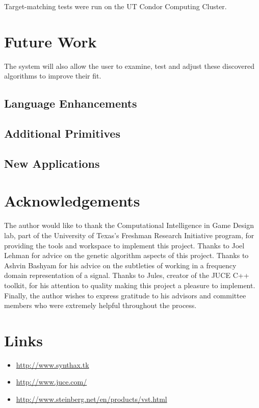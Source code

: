 \documentclass[12pt]{article}
\begin{document}
Target-matching tests were run on the UT Condor Computing Cluster. \begin{comment}Interactive evolution tests were run on a variety of different machines. TODO: fill in with actual data \end{comment}

\section{Future Work}
The system will also allow the user to examine, test and adjust these discovered algorithms to improve their fit.

\subsection{Language Enhancements}\label{FUTUREENHANCEMENTS}
\subsection{Additional Primitives}\label{FUTUREPRIMITIVES}
\subsection{New Applications}\label{FUTUREAPPLICATIONS}

\section{Acknowledgements}
The author would like to thank the Computational Intelligence in Game Design lab, part of the University of Texas's Freshman Research Initiative program, for providing the tools and workspace to implement this project. Thanks to Joel Lehman for advice on the genetic algorithm aspects of this project. Thanks to Ashvin Bashyam for his advice on the subtleties of working in a frequency domain representation of a signal. Thanks to Jules, creator of the JUCE C++ toolkit, for his attention to quality making this project a pleasure to implement. Finally, the author wishes to express gratitude to his advisors and committee members who were extremely helpful throughout the process.

\section{Links}
\begin{itemize}
\item{\url{http://www.synthax.tk}}
\item{\url{http://www.juce.com/}}
\item{\url{http://www.steinberg.net/en/products/vst.html}}
\end{itemize}



\end{document}
